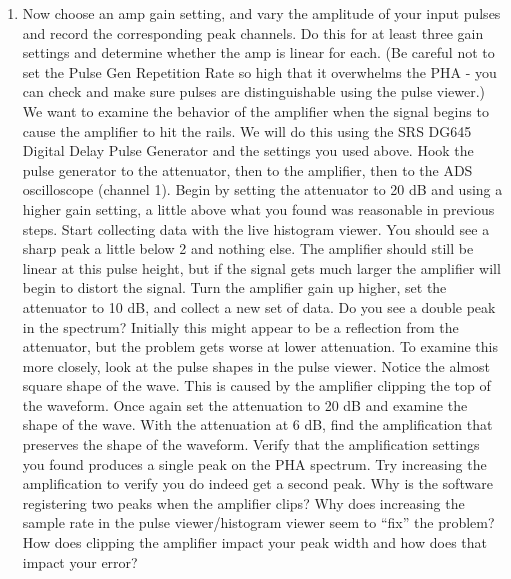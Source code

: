\documentclass{../lab}
\begin{document}
\begin{enumerate}
\begin{enumerate}
        \item The Delay Generator is an \textit{excellent} piece of equipment with a wonderful manual - if you have further questions about its operation or setup, please read the manual, available online and also linked below.

    \end{enumerate}

    \item Now choose an amp gain setting, and vary the amplitude of your input pulses and record the corresponding peak channels. Do this for at least three gain settings and determine whether the amp is linear for each. (Be careful not to set the Pulse Gen Repetition Rate so high that it overwhelms the PHA - you can check and make sure pulses are distinguishable using the pulse viewer.) We want to examine the behavior of the amplifier when the signal begins to cause the amplifier to hit the rails. We will do this using the SRS DG645 Digital Delay Pulse Generator and the settings you used above. Hook the pulse generator to the attenuator, then to the amplifier, then to the ADS oscilloscope (channel 1). Begin by setting the attenuator to 20 dB and using a higher gain setting, a little above what you found was reasonable in previous steps. Start collecting data with the live histogram viewer. You should see a sharp peak a little below 2 and nothing else. The amplifier should still be linear at this pulse height, but if the signal gets much larger the amplifier will begin to distort the signal. Turn the amplifier gain up higher, set the attenuator to 10 dB, and collect a new set of data. Do you see a double peak in the spectrum? Initially this might appear to be a reflection from the attenuator, but the problem gets worse at lower attenuation. To examine this more closely, look at the pulse shapes in the pulse viewer. Notice the almost square shape of the wave. This is caused by the amplifier clipping the top of the waveform. Once again set the attenuation to 20 dB and examine the shape of the wave. With the attenuation at 6 dB, find the amplification that preserves the shape of the waveform. Verify that the amplification settings you found produces a single peak on the PHA spectrum. Try increasing the amplification to verify you do indeed get a second peak. Why is the software registering two peaks when the amplifier clips? Why does increasing the sample rate in the pulse viewer/histogram viewer seem to ``fix'' the problem? How does clipping the amplifier impact your peak width and how does that impact your error?%
\end{enumerate}
\end{document}
